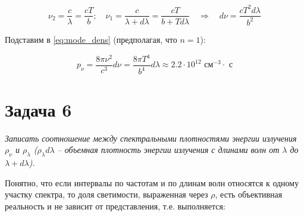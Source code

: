 \documentclass[a4paper, 12pt]{article}
\newcommand{\qrq}
{\ensuremath{\quad \Rightarrow \quad}} %
\newcommand{\med}[1]
{\ensuremath{\langle#1\rangle}}
\begin{document}
\begin{equation}
	\nu_2 = \frac{c}{\lambda} = \frac{c T}{b}; \quad \nu_1 = \frac{c}{\lambda + d\lambda} = \frac{c T}{b + T d\lambda} \qrq d\nu = \frac{c T^2 d\lambda}{b^2}
\end{equation}

Подставим в \ref{eq:mode_dens} (предполагая, что $n=1$):

\begin{equation}
	p_\nu =  \frac{8 \pi \nu^2}{c^3} d\nu = \frac{8\pi T^4}{b^4} d\lambda \approx 2.2 \cdot 10^{12} \text{ см$^{-3} \cdot$ с}
\end{equation}

\section{Задача 6}

\textit{Записать соотношение между спектральными плотностями энергии излучения $\rho_\nu$ и $\rho_\lambda$ ($\rho_\lambda d\lambda$ – объемная плотность энергии излучения с длинами волн от $\lambda$ до $\lambda + d\lambda$).}







Понятно, что если интервалы по частотам и по длинам волн относятся к одному участку спектра, то доля светимости, выраженная через $\rho$, есть объективная реальность и не зависит от представления, т.е. выполняется:
\end{document}
